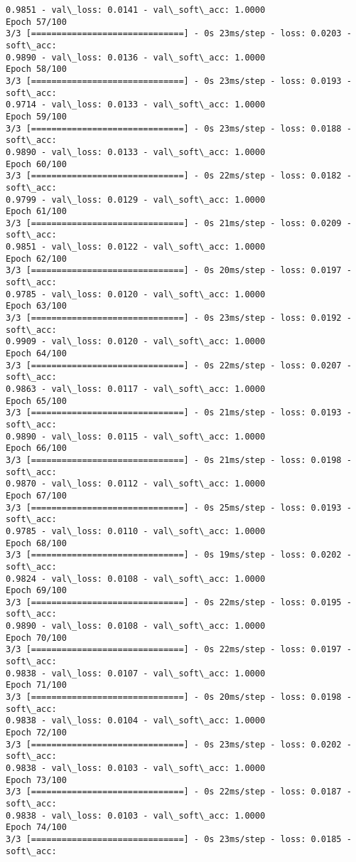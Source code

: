 \documentclass[11pt]{article}
\begin{document}
\begin{Verbatim}[commandchars=\\\{\}]
0.9851 - val\_loss: 0.0141 - val\_soft\_acc: 1.0000
Epoch 57/100
3/3 [==============================] - 0s 23ms/step - loss: 0.0203 - soft\_acc:
0.9890 - val\_loss: 0.0136 - val\_soft\_acc: 1.0000
Epoch 58/100
3/3 [==============================] - 0s 23ms/step - loss: 0.0193 - soft\_acc:
0.9714 - val\_loss: 0.0133 - val\_soft\_acc: 1.0000
Epoch 59/100
3/3 [==============================] - 0s 23ms/step - loss: 0.0188 - soft\_acc:
0.9890 - val\_loss: 0.0133 - val\_soft\_acc: 1.0000
Epoch 60/100
3/3 [==============================] - 0s 22ms/step - loss: 0.0182 - soft\_acc:
0.9799 - val\_loss: 0.0129 - val\_soft\_acc: 1.0000
Epoch 61/100
3/3 [==============================] - 0s 21ms/step - loss: 0.0209 - soft\_acc:
0.9851 - val\_loss: 0.0122 - val\_soft\_acc: 1.0000
Epoch 62/100
3/3 [==============================] - 0s 20ms/step - loss: 0.0197 - soft\_acc:
0.9785 - val\_loss: 0.0120 - val\_soft\_acc: 1.0000
Epoch 63/100
3/3 [==============================] - 0s 23ms/step - loss: 0.0192 - soft\_acc:
0.9909 - val\_loss: 0.0120 - val\_soft\_acc: 1.0000
Epoch 64/100
3/3 [==============================] - 0s 22ms/step - loss: 0.0207 - soft\_acc:
0.9863 - val\_loss: 0.0117 - val\_soft\_acc: 1.0000
Epoch 65/100
3/3 [==============================] - 0s 21ms/step - loss: 0.0193 - soft\_acc:
0.9890 - val\_loss: 0.0115 - val\_soft\_acc: 1.0000
Epoch 66/100
3/3 [==============================] - 0s 21ms/step - loss: 0.0198 - soft\_acc:
0.9870 - val\_loss: 0.0112 - val\_soft\_acc: 1.0000
Epoch 67/100
3/3 [==============================] - 0s 25ms/step - loss: 0.0193 - soft\_acc:
0.9785 - val\_loss: 0.0110 - val\_soft\_acc: 1.0000
Epoch 68/100
3/3 [==============================] - 0s 19ms/step - loss: 0.0202 - soft\_acc:
0.9824 - val\_loss: 0.0108 - val\_soft\_acc: 1.0000
Epoch 69/100
3/3 [==============================] - 0s 22ms/step - loss: 0.0195 - soft\_acc:
0.9890 - val\_loss: 0.0108 - val\_soft\_acc: 1.0000
Epoch 70/100
3/3 [==============================] - 0s 22ms/step - loss: 0.0197 - soft\_acc:
0.9838 - val\_loss: 0.0107 - val\_soft\_acc: 1.0000
Epoch 71/100
3/3 [==============================] - 0s 20ms/step - loss: 0.0198 - soft\_acc:
0.9838 - val\_loss: 0.0104 - val\_soft\_acc: 1.0000
Epoch 72/100
3/3 [==============================] - 0s 23ms/step - loss: 0.0202 - soft\_acc:
0.9838 - val\_loss: 0.0103 - val\_soft\_acc: 1.0000
Epoch 73/100
3/3 [==============================] - 0s 22ms/step - loss: 0.0187 - soft\_acc:
0.9838 - val\_loss: 0.0103 - val\_soft\_acc: 1.0000
Epoch 74/100
3/3 [==============================] - 0s 23ms/step - loss: 0.0185 - soft\_acc:

\end{Verbatim}
\end{document}
